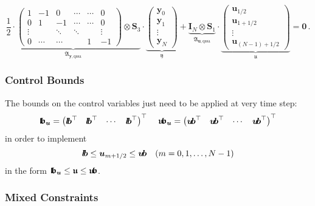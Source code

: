 \documentclass{article}
\newcommand{\tp}{\top}%
\newcommand{\kron}{\otimes}%
\newcommand{\vectorfont}[1]{\boldsymbol{#1}}%
\newcommand{\greekvectorfont}[1]{\boldsymbol{#1}}%
\newcommand{\matrixfont}[1]{\mathbf{#1}}%
\newcommand{\uvec}{\vectorfont{u}}
\newcommand{\yvec}{\vectorfont{y}}
\newcommand{\ufrakvec}{\vectorfont{\mathfrak{u}}}
\newcommand{\yfrakvec}{\vectorfont{\mathfrak{y}}}
\newcommand{\nullvec}{\greekvectorfont{0}}
\newcommand{\lbvec}{\vectorfont{l\negthinspace b}}
\newcommand{\ubvec}{\vectorfont{u\negthinspace b}}
\newcommand{\lbfrakvec}{\vectorfont{\mathfrak{l\negthinspace b}}}
\newcommand{\ubfrakvec}{\vectorfont{\mathfrak{u\negthinspace b}}}
\newcommand{\Imat}{\matrixfont{I}}%
\newcommand{\Smat}{\matrixfont{S}}
\newcommand{\Afrakmat}{\matrixfont{\mathfrak{A}}}
\begin{document}
\[
\underbrace{
\frac{1}{2} \cdot
\begin{pmatrix}
	1      & -1     &  0     & \cdots & \cdots & 0      \\
	0      &  1     & -1     & \cdots & \cdots & 0      \\
	\vdots &        & \ddots & \ddots &        & \vdots \\
	0      & \cdots & \cdots &        & 1      & -1
\end{pmatrix}
\kron \Smat_3
}_{\Afrakmat_{\yvec,\mathrm{qssa}}} 
\cdot 
\underbrace{
\begin{pmatrix}
	\yvec_0 \\ \yvec_1 \\ \vdots \\ \yvec_N
\end{pmatrix}
}_{\yfrakvec}
+
\underbrace{
\Imat_{N} \kron \Smat_1
}_{\Afrakmat_{\uvec, \mathrm{qssa}}}
\cdot 
\underbrace{
\begin{pmatrix}
	\uvec_{1/2} \\ \uvec_{1+1/2} \\ \vdots \\ \uvec_{(N-1)+1/2}
\end{pmatrix}
}_{\ufrakvec}
= \nullvec\,.
\]

\subsubsection*{Control Bounds}

The bounds on the control variables just need to be applied at very time step:
\[
\lbfrakvec_{\uvec}
= \begin{pmatrix} 	\lbvec^{\tp} & \lbvec^{\tp} & \cdots & \lbvec^{\tp} \end{pmatrix}^{\tp}
\,\quad
\ubfrakvec_{\uvec}
= \begin{pmatrix} 	\ubvec^{\tp} & \ubvec^{\tp} & \cdots & \ubvec^{\tp} \end{pmatrix}^{\tp}
\]
in order to implement
\[
\lbvec \leq \uvec_{m+1/2} \leq \ubvec \quad (m = 0, 1, \ldots,N-1)
\]
in the form $\lbfrakvec_{\uvec} \leq \ufrakvec \leq \ubfrakvec$.
\subsubsection*{Mixed Constraints}
\end{document}
